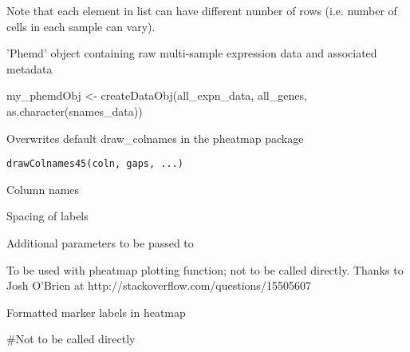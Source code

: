 \documentclass[a4paper]{book}
\begin{document}
%
\begin{Details}\relax
Note that each element in list can have different number of rows (i.e. number of cells in each sample can vary).
\end{Details}
%
\begin{Value}
'Phemd' object containing raw multi-sample expression data and associated metadata
\end{Value}
%
\begin{Examples}
\begin{ExampleCode}
my_phemdObj <- createDataObj(all_expn_data, all_genes, as.character(snames_data))

\end{ExampleCode}
\end{Examples}
%
\begin{Description}\relax
Overwrites default draw\_colnames in the pheatmap package
\end{Description}
%
\begin{Usage}
\begin{verbatim}
drawColnames45(coln, gaps, ...)
\end{verbatim}
\end{Usage}
%
\begin{Arguments}
\begin{ldescription}
\item[\code{coln}] Column names

\item[\code{gaps}] Spacing of labels

\item[\code{...}] Additional parameters to be passed to 
\end{ldescription}
\end{Arguments}
%
\begin{Details}\relax
To be used with pheatmap plotting function; not to be called directly. Thanks to Josh O'Brien at http://stackoverflow.com/questions/15505607
\end{Details}
%
\begin{Value}
Formatted marker labels in heatmap
\end{Value}
%
\begin{Examples}
\begin{ExampleCode}
#Not to be called directly
\end{ExampleCode}
\end{Examples}
\end{document}
